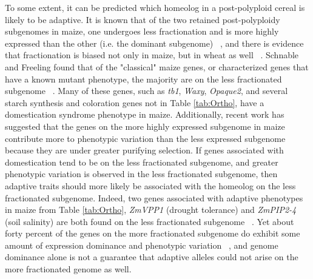 \documentclass[12pt]{article}
\begin{document}
To some extent, it can be predicted which homeolog in a post-polyploid cereal is likely to be adaptive.
It is known that of the two retained post-polyploidy subgenomes in maize, one undergoes less fractionation and is more highly expressed than the other (i.e. the dominant subgenome) ~\citep{Woodhouse2010, Schnable2011}, and there is evidence that fractionation is biased not only in maize, but in wheat as well ~\citep{Eckardt2014}.
Schnable and Freeling found that of the "classical" maize genes, or characterized genes that have a known mutant phenotype, the majority are on the less fractionated subgenome ~\citep{Schnable20112}.
Many of these genes, such as \textit{tb1}, \textit{Waxy}, \textit{Opaque2}, and several starch synthesis and coloration genes not in Table \ref{tab:Ortho}, have a domestication syndrome phenotype in maize.
Additionally, recent work has suggested that the genes on the more highly expressed subgenome in maize contribute more to phenotypic variation than the less expressed subgenome ~\citep{RennyByfield2017} because they are under greater purifying selection.
If genes associated with domestication tend to be on the less fractionated subgenome, and greater phenotypic variation is observed in the less fractionated subgenome, then adaptive traits should more likely be associated with the homeolog on the less fractionated subgenome.
Indeed, two genes associated with adaptive phenotypes in maize from Table \ref{tab:Ortho}, \textit{ZmVPP1} (drought tolerance) and \textit{ZmPIP2-4} (soil salinity) are both found on the less fractionated subgenome ~\citep{Schnable20112}.
Yet about forty percent of the genes on the more fractionated subgenome do exhibit some amount of expression dominance and phenotypic variation ~\citep{RennyByfield2017}, and genome dominance alone is not a guarantee that adaptive alleles could not arise on the more fractionated genome as well.  
\end{document}
